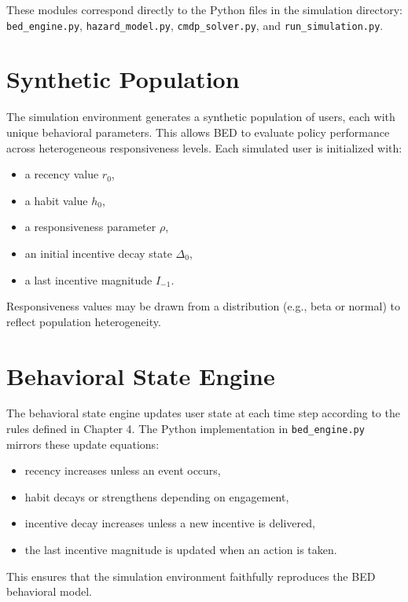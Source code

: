 These modules correspond directly to the Python files in the simulation
directory: \texttt{bed\_engine.py}, \texttt{hazard\_model.py},
\texttt{cmdp\_solver.py}, and \texttt{run\_simulation.py}.

\section{Synthetic Population}

The simulation environment generates a synthetic population of users, each with
unique behavioral parameters. This allows BED to evaluate policy performance
across heterogeneous responsiveness levels. Each simulated user is initialized
with:

\begin{itemize}
    \item a recency value $r_0$,
    \item a habit value $h_0$,
    \item a responsiveness parameter $\rho$,
    \item an initial incentive decay state $\Delta_0$,
    \item a last incentive magnitude $I_{-1}$.
\end{itemize}

Responsiveness values may be drawn from a distribution (e.g., beta or normal)
to reflect population heterogeneity.

\section{Behavioral State Engine}

The behavioral state engine updates user state at each time step according to
the rules defined in Chapter 4. The Python implementation in
\texttt{bed\_engine.py} mirrors these update equations:

\begin{itemize}
    \item recency increases unless an event occurs,
    \item habit decays or strengthens depending on engagement,
    \item incentive decay increases unless a new incentive is delivered,
    \item the last incentive magnitude is updated when an action is taken.
\end{itemize}

This ensures that the simulation environment faithfully reproduces the BED
behavioral model.

